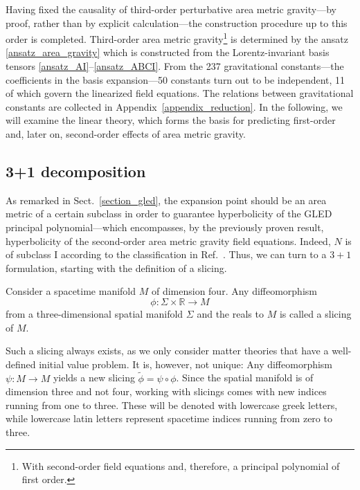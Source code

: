 Having fixed the causality of third-order perturbative area metric gravity---by proof, rather than by explicit calculation---the construction procedure up to this order is completed. Third-order area metric gravity\footnote{With second-order field equations and, therefore, a principal polynomial of first order.} is determined by the ansatz \eqref{ansatz_area_gravity} which is constructed from the Lorentz-invariant basis tensors \eqref{ansatz_AI}--\eqref{ansatz_ABCI}. From the 237 gravitational constants---the coefficients in the basis expansion---50 constants turn out to be independent, 11 of which govern the linearized field equations. The relations between gravitational constants are collected in Appendix~\ref{appendix_reduction}. In the following, we will examine the linear theory, which forms the basis for predicting first-order and, later on, second-order effects of area metric gravity.

\subsection{3+1 decomposition}
\label{sect_three_plus_one}
As remarked in Sect.~\ref{section_gled}, the expansion point should be an area metric of a certain subclass in order to guarantee hyperbolicity of the GLED principal polynomial---which encompasses, by the previously proven result, hyperbolicity of the second-order area metric gravity field equations. Indeed, $N$ is of subclass I according to the classification in Ref.\ \cite{Schuller_2010}. Thus, we can turn to a $3+1$ formulation, starting with the definition of a slicing.
\begin{definition}[slicing]
  Consider a spacetime manifold $M$ of dimension four. Any diffeomorphism
  \begin{equation}
    \phi\colon \Sigma\times\mathbb R \rightarrow M
  \end{equation}
  from a three-dimensional spatial manifold $\Sigma$ and the reals to $M$ is called a slicing of $M$.
\end{definition}
Such a slicing always exists, as we only consider matter theories that have a well-defined initial value problem. It is, however, not unique: Any diffeomorphism $\psi\colon M\rightarrow M$ yields a new slicing $\tilde\phi = \psi\circ\phi$. Since the spatial manifold is of dimension three and not four, working with slicings comes with new indices running from one to three. These will be denoted with lowercase greek letters, while lowercase latin letters represent spacetime indices running from zero to three.

